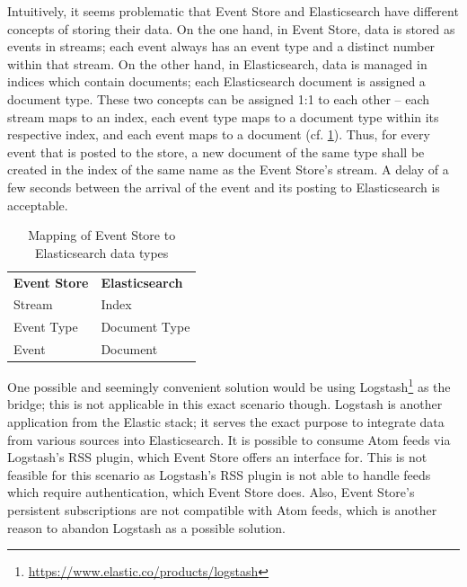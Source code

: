 
Intuitively, it seems problematic that Event Store and Elasticsearch have different concepts of storing their data.
On the one hand, in Event Store, data is stored as events in streams; each event always has an event type and a distinct number within that stream.
On the other hand, in Elasticsearch, data is managed in indices which contain documents; each Elasticsearch document is assigned a document type.
These two concepts can be assigned 1:1 to each other -- each stream maps to an index, each event type maps to a document type within its respective index, and each event maps to a document (cf. \cref{table:design:bridge}).
Thus, for every event that is posted to the store, a new document of the same type shall be created in the index of the same name as the Event Store's stream.
A delay of a few seconds between the arrival of the event and its posting to Elasticsearch is acceptable.

\begin{table}[]
\centering
\caption{Mapping of Event Store to Elasticsearch data types}
\label{table:design:bridge}
\begin{tabular}{l|l}
\textbf{Event Store} & \textbf{Elasticsearch} \\ \cline{1-2}
Stream & Index \\
Event Type & Document Type \\
Event & Document
\end{tabular}
\end{table}

One possible and seemingly convenient solution would be using Logstash\footnote{\url{https://www.elastic.co/products/logstash}} as the bridge; this is not applicable in this exact scenario though.
Logstash is another application from the Elastic stack; it serves the exact purpose to integrate data from various sources into Elasticsearch.
It is possible to consume Atom feeds via Logstash's \ac{RSS} plugin, which Event Store offers an interface for.
This is not feasible for this scenario as Logstash's \ac{RSS} plugin is not able to handle feeds which require authentication, which Event Store does.
Also, Event Store's persistent subscriptions are not compatible with Atom feeds, which is another reason to abandon Logstash as a possible solution.

